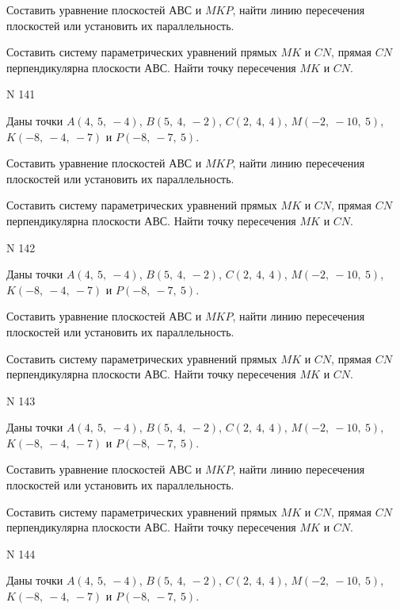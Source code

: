 \documentclass[11pt]{report}
\begin{document}
Составить уравнение плоскостей $АВС$ и $MKP$,
найти линию пересечения плоскостей или установить их параллельность.

Составить систему параметрических уравнений прямых $MK$ и $CN$,
прямая $CN$ перпендикулярна плоскости $АВС$. 
Найти точку пересечения $MK$ и $CN$.



 N 141

Даны точки $A\left( 4, \  5, \  -4\right)$, $B\left( 5, \  4, \  -2\right)$, $C\left( 2, \  4, \  4\right)$, $M\left( -2, \  -10, \  5\right)$, $K\left( -8, \  -4, \  -7\right)$ и $P\left( -8, \  -7, \  5\right)$.


Составить уравнение плоскостей $АВС$ и $MKP$,
найти линию пересечения плоскостей или установить их параллельность.

Составить систему параметрических уравнений прямых $MK$ и $CN$,
прямая $CN$ перпендикулярна плоскости $АВС$. 
Найти точку пересечения $MK$ и $CN$.



 N 142

Даны точки $A\left( 4, \  5, \  -4\right)$, $B\left( 5, \  4, \  -2\right)$, $C\left( 2, \  4, \  4\right)$, $M\left( -2, \  -10, \  5\right)$, $K\left( -8, \  -4, \  -7\right)$ и $P\left( -8, \  -7, \  5\right)$.


Составить уравнение плоскостей $АВС$ и $MKP$,
найти линию пересечения плоскостей или установить их параллельность.

Составить систему параметрических уравнений прямых $MK$ и $CN$,
прямая $CN$ перпендикулярна плоскости $АВС$. 
Найти точку пересечения $MK$ и $CN$.



 N 143

Даны точки $A\left( 4, \  5, \  -4\right)$, $B\left( 5, \  4, \  -2\right)$, $C\left( 2, \  4, \  4\right)$, $M\left( -2, \  -10, \  5\right)$, $K\left( -8, \  -4, \  -7\right)$ и $P\left( -8, \  -7, \  5\right)$.


Составить уравнение плоскостей $АВС$ и $MKP$,
найти линию пересечения плоскостей или установить их параллельность.

Составить систему параметрических уравнений прямых $MK$ и $CN$,
прямая $CN$ перпендикулярна плоскости $АВС$. 
Найти точку пересечения $MK$ и $CN$.



 N 144

Даны точки $A\left( 4, \  5, \  -4\right)$, $B\left( 5, \  4, \  -2\right)$, $C\left( 2, \  4, \  4\right)$, $M\left( -2, \  -10, \  5\right)$, $K\left( -8, \  -4, \  -7\right)$ и $P\left( -8, \  -7, \  5\right)$.
\end{document}
